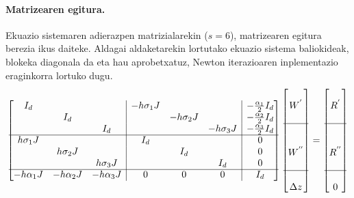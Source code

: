 \paragraph*{Matrizearen egitura.} Ekuazio sistemaren adierazpen matrizialarekin ($s=6$), matrizearen egitura berezia ikus daiteke. Aldagai aldaketarekin lortutako ekuazio sistema baliokideak, blokeka diagonala da eta hau aprobetxatuz, Newton iterazioaren inplementazio eraginkorra lortuko dugu.    
\begin{equation*}
\begin{bmatrix}
 I_d        &             &                     & \multicolumn{1}{|c}{-h\sigma_1 J} &            &                  &\multicolumn{1}{|c}{-\frac{\alpha_1}{2} I_d}\\
            & I_d         &                     & \multicolumn{1}{|c}{}           & -h\sigma_2 J &                
 &\multicolumn{1}{|c}{-\frac{\alpha_2}{2} I_d}\\
            &             & I_d                 & \multicolumn{1}{|c}{}           &            & -h\sigma_3 J  
 &\multicolumn{1}{|c}{-\frac{\alpha_3}{2} I_d}\\\cline{1-7}    
h\sigma_1 J &             &                     & \multicolumn{1}{|c}{I_d}        &            &            
 &\multicolumn{1}{|c}{0}\\
            & h\sigma_2 J &                     & \multicolumn{1}{|c}{}           &  I_d       &             
 &\multicolumn{1}{|c}{0}\\
            &             &  h\sigma_3 J        & \multicolumn{1}{|c}{}           &            &  I_d        
 &\multicolumn{1}{|c}{0}\\\cline{1-7}
 -h\alpha_1 J       & -h\alpha_2 J              &  -h\alpha_3 J                    & \multicolumn{1}{|c}{$0$}        &  $0$       &  $0$         
 &\multicolumn{1}{|c}{ I_d}\\
\end{bmatrix}
\begin{bmatrix}
         \\
 W^{'} \\
    \\
\cline{1-1} \\
    \\
 W^{''}   \\
    \\
    \cline{1-1} \\
 \Delta z  \\
\end{bmatrix}=
\begin{bmatrix}
         \\
 R^{'} \\
    \\
\cline{1-1} \\
    \\
 R^{''}   \\
    \\
    \cline{1-1} \\
 0  \\
\end{bmatrix}
\end{equation*} 
